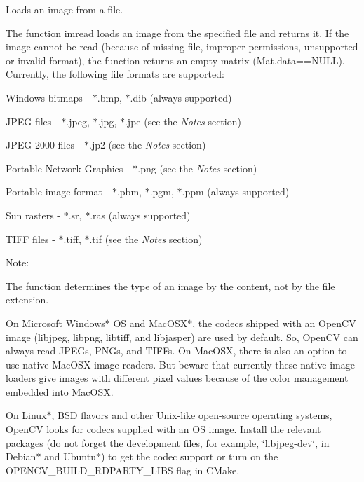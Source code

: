 Loads an image from a file.

The function {\ttfamily imread} loads an image from the specified file and returns it. If the image cannot be read (because of missing file, improper permissions, unsupported or invalid format), the function returns an empty matrix ({\ttfamily Mat.\+data==N\+U\+LL}). Currently, the following file formats are supported\+:


\begin{DoxyItemize}
\item Windows bitmaps -\/ {\ttfamily $\ast$.bmp, $\ast$.dib} (always supported) 
\item J\+P\+EG files -\/ {\ttfamily $\ast$.jpeg, $\ast$.jpg, $\ast$.jpe} (see the {\itshape Notes} section) 
\item J\+P\+EG 2000 files -\/ {\ttfamily $\ast$.jp2} (see the {\itshape Notes} section) 
\item Portable Network Graphics -\/ {\ttfamily $\ast$.png} (see the {\itshape Notes} section) 
\item Portable image format -\/ {\ttfamily $\ast$.pbm, $\ast$.pgm, $\ast$.ppm} (always supported) 
\item Sun rasters -\/ {\ttfamily $\ast$.sr, $\ast$.ras} (always supported) 
\item T\+I\+FF files -\/ {\ttfamily $\ast$.tiff, $\ast$.tif} (see the {\itshape Notes} section) 
\end{DoxyItemize}

Note\+:


\begin{DoxyItemize}
\item The function determines the type of an image by the content, not by the file extension. 
\item On Microsoft Windows$\ast$ OS and Mac\+O\+S\+X$\ast$, the codecs shipped with an Open\+CV image (libjpeg, libpng, libtiff, and libjasper) are used by default. So, Open\+CV can always read J\+P\+E\+Gs, P\+N\+Gs, and T\+I\+F\+Fs. On Mac\+O\+SX, there is also an option to use native Mac\+O\+SX image readers. But beware that currently these native image loaders give images with different pixel values because of the color management embedded into Mac\+O\+SX. 
\item On Linux$\ast$, B\+SD flavors and other Unix-\/like open-\/source operating systems, Open\+CV looks for codecs supplied with an OS image. Install the relevant packages (do not forget the development files, for example, \char`\"{}libjpeg-\/dev\char`\"{}, in Debian$\ast$ and Ubuntu$\ast$) to get the codec support or turn on the {\ttfamily O\+P\+E\+N\+C\+V\+\_\+\+B\+U\+I\+L\+D\+\_\+R\+D\+P\+A\+R\+T\+Y\+\_\+\+L\+I\+BS} flag in C\+Make. 
\end{DoxyItemize}

